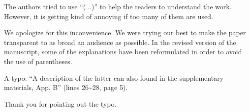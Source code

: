 \begin{reviewer}
The authors tried to use  ``(...)'' to help the readers to understand the work. However, it is getting kind of annoying if too many of them are used.
\end{reviewer}
\begin{authors}
We apologize for this inconvenience.
We were trying our best to make the paper transparent to as broad an audience as possible.
In the revised version of the manuscript, some of the explanations have been reformulated in order to avoid the use of parentheses.

\begin{actions}
\end{actions}
\end{authors}

\begin{reviewer}
A typo: ``A description of the latter can also found in the supplementary materials, App. B'' (lines 26\~{}28, page 5).
\end{reviewer}
\begin{authors}
Thank you for pointing out the typo.

\begin{actions}
\end{actions}
\end{authors}
